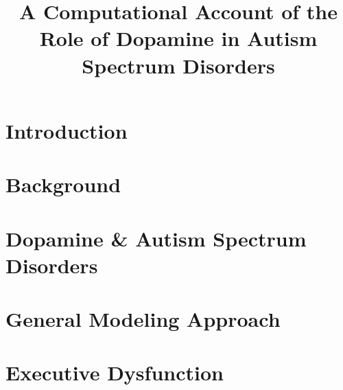 \documentclass[man]{apa}
\title{A Computational Account of the Role of Dopamine in Autism Spectrum Disorders}
\begin{document}
\maketitle 

%
% 
% 


\section{Introduction}
\label{section:introduction}




\section{Background}
\label{section:background}




\section{Dopamine \& Autism Spectrum Disorders}
\label{section:hypothesis}




\section{General Modeling Approach}
\label{section:approach}




\section{Executive Dysfunction}
\label{section:executive}


\end{document}
